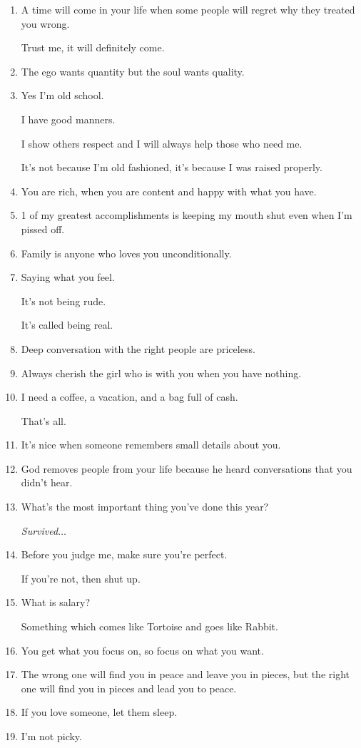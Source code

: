\documentclass{article}
\numberwithin{equation}{section}
\begin{document}
\begin{enumerate}
    Loyalty is a responsibility, not a choice.
    \item A time will come in your life when some people will regret why they treated you wrong.
    
    Trust me, it will definitely come.
    \item The ego wants quantity but the soul wants quality.
    \item Yes I'm old school.
    
    I have good manners.
    
    I show others respect and I will always help those who need me.
    
    It's not because I'm old fashioned, it's because I was raised properly.
    \item You are rich, when you are content and happy with what you have.
    \item 1 of my greatest accomplishments is keeping my mouth shut even when I'm pissed off.
    \item Family is anyone who loves you unconditionally.
    \item Saying what you feel.
    
    It's not being rude.
    
    It's called being real.
    \item Deep conversation with the right people are priceless.
    \item Always cherish the girl who is with you when you have nothing.
    \item I need a coffee, a vacation, and a bag full of cash.
    
    That's all.
    \item It's nice when someone remembers small details about you.
    \item God removes people from your life because he heard conversations that you didn't hear.
    \item What's the most important thing you've done this year?
    
    \textit{Survived}$\ldots$
    \item Before you judge me, make sure you're perfect.
    
    If you're not, then shut up.
    \item What is salary?
    
    Something which comes like Tortoise and goes like Rabbit.
    \item You get what you focus on, so focus on what you want.
    \item The wrong one will find you in peace and leave you in pieces, but the right one will find you in pieces and lead you to peace.
    \item If you love someone, let them sleep.
    \item I'm not picky.
    

\end{enumerate}
\end{document}

